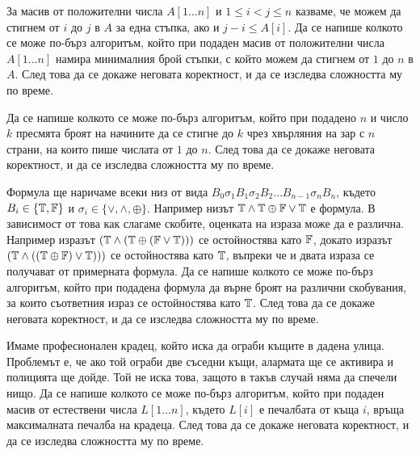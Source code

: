 \begin{problem}
За масив от положителни числа $A[1 \dots n]$ и $1 \leq i < j \leq n$ казваме, че можем да стигнем от $i$ до $j$ в $A$ за една стъпка, ако и $j - i \leq A[i]$.
Да се напише колкото се може по-бърз алгоритъм, който при подаден масив от положителни числа $A[1 \dots n]$ намира минималния брой стъпки, с който можем да стигнем от $1$ до $n$ в $A$.
След това да се докаже неговата коректност, и да се изследва сложността му по време.
\end{problem}

\begin{problem}
Да се напише колкото се може по-бърз алгоритъм, който при подадено $n$ и число $k$ пресмята броят на начините да се стигне до $k$ чрез хвърляния на зар с $n$ страни, на които пише числата от $1$ до $n$.
След това да се докаже неговата коректност, и да се изследва сложността му по време.
\end{problem}

\begin{problem}
Формула ще наричаме всеки низ от вида $B_0 \sigma_1 B_1 \sigma_2 B_2 \dots B_{n - 1} \sigma_n B_n$, където $B_i \in \{ \mathbb{T}, \mathbb{F} \}$ и $\sigma_i \in \{ \lor, \land, \oplus \}$.
Например низът $\mathbb{T} \land \mathbb{T} \oplus \mathbb{F} \lor \mathbb{T}$ е формула.
В зависимост от това как слагаме скобите, оценката на израза може да е различна.
Например изразът $(\mathbb{T} \land (\mathbb{T} \oplus (\mathbb{F} \lor \mathbb{T})))$ се остойностява като $\mathbb{F}$, докато изразът $(\mathbb{T} \land ((\mathbb{T} \oplus \mathbb{F}) \lor \mathbb{T})))$ се остойностява като $\mathbb{T}$, въпреки че и двата израза се получават от примерната формула.
Да се напише колкото се може по-бърз алгоритъм, който при подадена формула да върне броят на различни скобувания, за които съответния израз се остойностява като $\mathbb{T}$.
След това да се докаже неговата коректност, и да се изследва сложността му по време.
\end{problem}

\begin{problem}
Имаме професионален крадец, който иска да ограби къщите в дадена улица.
Проблемът е, че ако той ограби две съседни къщи, алармата ще се активира и полицията ще дойде.
Той не иска това, защото в такъв случай няма да спечели нищо.
Да се напише колкото се може по-бърз алгоритъм, който при подаден масив от естествени числа $L[1 \dots n]$, където $L[i]$ е печалбата от къща $i$, връща максималната печалба на крадеца.
След това да се докаже неговата коректност, и да се изследва сложността му по време.
\end{problem}

